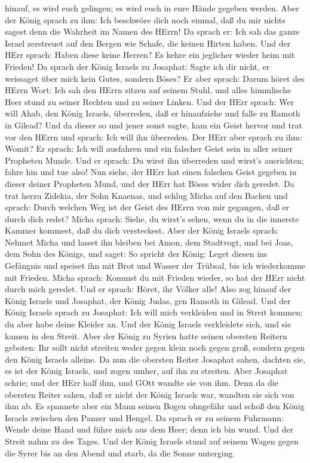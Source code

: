 hinauf, es wird euch gelingen; es wird euch in eure Hände gegeben
werden.  Aber der König sprach zu ihm: Ich beschwöre dich
noch einmal, daß du mir nichts sagest denn die Wahrheit im Namen des
HErrn!  Da sprach er: Ich sah das ganze Israel zerstreuet
auf den Bergen wie Schafe, die keinen Hirten haben. Und der HErr sprach:
Haben diese keine Herren? Es kehre ein jeglicher wieder heim mit
Frieden!  Da sprach der König Israels zu Josaphat: Sagte
ich dir nicht, er weissaget über mich kein Gutes, sondern Böses?
 Er aber sprach: Darum höret des HErrn Wort: Ich sah den
HErrn sitzen auf seinem Stuhl, und alles himmlische Heer stund zu seiner
Rechten und zu seiner Linken.  Und der HErr sprach: Wer
will Ahab, den König Israels, überreden, daß er hinaufziehe und falle zu
Ramoth in Gilead? Und da dieser so und jener sonst sagte, 
kam ein Geist hervor und trat vor den HErrn und sprach: Ich will ihn
überreden. Der HErr aber sprach zu ihm: Womit?  Er sprach:
Ich will ausfahren und ein falscher Geist sein in aller seiner Propheten
Munde. Und er sprach: Du wirst ihn überreden und wirst's ausrichten;
fahre hin und tue also!  Nun siehe, der HErr hat einen
falschen Geist gegeben in dieser deiner Propheten Mund, und der HErr hat
Böses wider dich geredet.  Da trat herzu Zidekia, der Sohn
Knaenas, und schlug Micha auf den Backen und sprach: Durch welchen Weg
ist der Geist des HErrn von mir gegangen, daß er durch dich redet?
 Micha sprach: Siehe, du wirst's sehen, wenn du in die
innerste Kammer kommest, daß du dich versteckest.  Aber der
König Israels sprach: Nehmet Micha und lasset ihn bleiben bei Amon, dem
Stadtvogt, und bei Joas, dem Sohn des Königs,  und saget:
So spricht der König: Leget diesen ins Gefängnis und speiset ihn mit
Brot und Wasser der Trübsal, bis ich wiederkomme mit Frieden.
 Micha sprach: Kommst du mit Frieden wieder, so hat der
HErr nicht durch mich geredet. Und er sprach: Höret, ihr Völker alle!
 Also zog hinauf der König Israels und Josaphat, der König
Judas, gen Ramoth in Gilead.  Und der König Israels sprach
zu Josaphat: Ich will mich verkleiden und in Streit kommen; du aber habe
deine Kleider an. Und der König Israels verkleidete sich, und sie kamen
in den Streit.  Aber der König zu Syrien hatte seinen
obersten Reitern geboten: Ihr sollt nicht streiten weder gegen klein
noch gegen groß, sondern gegen den König Israels alleine. 
Da nun die obersten Reiter Josaphat sahen, dachten sie, es ist der König
Israels, und zogen umher, auf ihn zu streiten. Aber Josaphat schrie; und
der HErr half ihm, und GOtt wandte sie von ihm.  Denn da
die obersten Reiter sahen, daß er nicht der König Israels war, wandten
sie sich von ihm ab.  Es spannete aber ein Mann seinen
Bogen ohngefähr und schoß den König Israels zwischen den Panzer und
Hengel. Da sprach er zu seinem Fuhrmann: Wende deine Hand und führe mich
aus dem Heer; denn ich bin wund.  Und der Streit nahm zu
des Tages. Und der König Israels stund auf seinem Wagen gegen die Syrer
bis an den Abend und starb, da die Sonne unterging.

